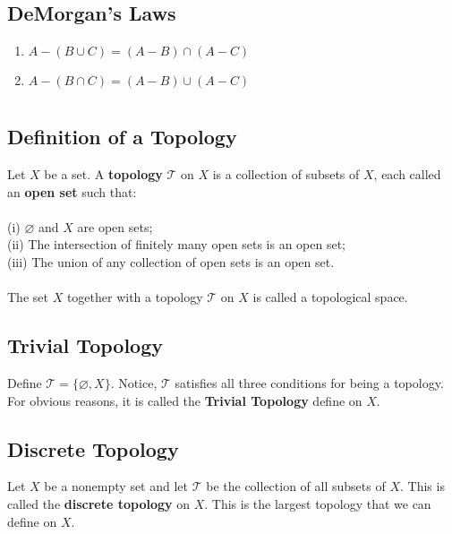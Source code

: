 \documentclass[12pt]{article}
\newcommand{\T}{\mathcal{T}}
\begin{document}
\pagestyle{fancy}  
\lfoot{} \cfoot{} \rfoot{}

\setcounter{section}{-1}

\section{}
	\subsection{DeMorgan's Laws}
		\begin{enumerate}
			\item $ A-(B\cup C) = (A-B)\cap(A-C) $
			\item $ A-(B\cap C) = (A-B)\cup(A-C) $
		\end{enumerate}
	
	\section{}
	\subsection{Definition of a Topology}
		Let $ X $ be a set. A \textbf{topology} $ \T $ on $ X $ is a collection of subsets of $ X $, each called an \textbf{open set} such that:\\
		\\
			(i) $\varnothing$ and $X$ are open sets;\\
			(ii) The intersection of finitely many open sets is an open set;\\
			(iii) The union of any collection of open sets is an open set.\\
		\\
		The set $X$ together with a topology $\mathcal { T }$ on $X$ is called a topological space.
	\subsection{Trivial Topology}
		Define $ \T = \{\varnothing,X\} $. Notice, $ \T $ satisfies all three conditions for being a topology. For obvious reasons, it is called the \textbf{Trivial Topology} define on $ X $.
	\subsection{Discrete Topology}
		Let $ X $ be a nonempty set and let $ \T  $ be the collection of all subsets of $ X $. This is called the \textbf{discrete topology} on $ X $. This is the largest topology that we can define on $ X $.
\end{document}
